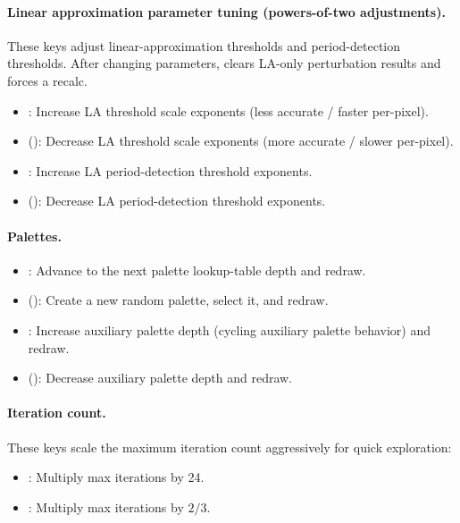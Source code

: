 \paragraph{Linear approximation parameter tuning (powers-of-two adjustments).}
These keys adjust linear-approximation thresholds and period-detection thresholds.
After changing parameters, \FractalShark{} clears LA-only perturbation results and
forces a recalc.
\begin{itemize}
  \item {}: Increase LA threshold scale exponents (less accurate / faster per-pixel).
  \item {} (): Decrease LA threshold scale exponents (more accurate / slower per-pixel).
  \item {}: Increase LA period-detection threshold exponents.
  \item {} (): Decrease LA period-detection threshold exponents.
\end{itemize}

\paragraph{Palettes.}
\begin{itemize}
  \item {}: Advance to the next palette lookup-table depth and redraw.
  \item {} (): Create a new random palette, select it, and redraw.
  \item {}: Increase auxiliary palette depth (cycling auxiliary palette behavior) and redraw.
  \item {} (): Decrease auxiliary palette depth and redraw.
\end{itemize}

\paragraph{Iteration count.}
These keys scale the maximum iteration count aggressively for quick exploration:
\begin{itemize}
  \item \code{=} : Multiply max iterations by 24.
  \item \code{-} : Multiply max iterations by $2/3$.
\end{itemize}

